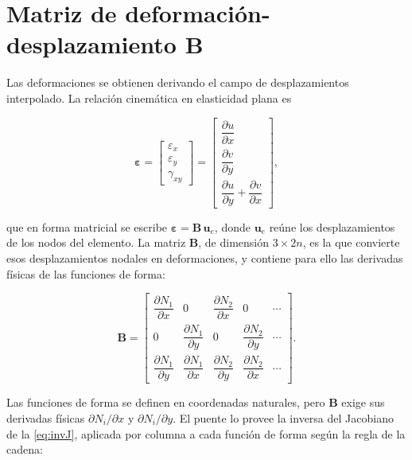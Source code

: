 \section{Matriz de deformación-desplazamiento B}
\label{sec:matriz-b}

Las deformaciones se obtienen derivando el campo de desplazamientos interpolado. La relación cinemática en elasticidad plana es

\begin{equation}
\bm{\varepsilon} =
\begin{bmatrix} \varepsilon_x \\ \varepsilon_y \\ \gamma_{xy} \end{bmatrix}
=
\begin{bmatrix}
\dfrac{\partial u}{\partial x} \\[4pt]
\dfrac{\partial v}{\partial y} \\[4pt]
\dfrac{\partial u}{\partial y} + \dfrac{\partial v}{\partial x}
\end{bmatrix},
\label{eq:cinematica}
\end{equation}

que en forma matricial se escribe $\bm{\varepsilon} = \bm{B}\,\bm{u}_e$, donde $\bm{u}_e$ reúne los desplazamientos de los nodos del elemento. La matriz $\bm{B}$, de dimensión $3 \times 2n$, es la que convierte esos desplazamientos nodales en deformaciones, y contiene para ello las derivadas físicas de las funciones de forma:

\begin{equation}
\bm{B} =
\begin{bmatrix}
\dfrac{\partial N_1}{\partial x} & 0 & \dfrac{\partial N_2}{\partial x} & 0 & \cdots \\[6pt]
0 & \dfrac{\partial N_1}{\partial y} & 0 & \dfrac{\partial N_2}{\partial y} & \cdots \\[6pt]
\dfrac{\partial N_1}{\partial y} & \dfrac{\partial N_1}{\partial x} & \dfrac{\partial N_2}{\partial y} & \dfrac{\partial N_2}{\partial x} & \cdots
\end{bmatrix}.
\label{eq:matriz-B}
\end{equation}

Las funciones de forma se definen en coordenadas naturales, pero $\bm{B}$ exige sus derivadas físicas $\partial N_i/\partial x$ y $\partial N_i/\partial y$. El puente lo provee la inversa del Jacobiano de la \autoref{eq:invJ}, aplicada por columna a cada función de forma según la regla de la cadena:

